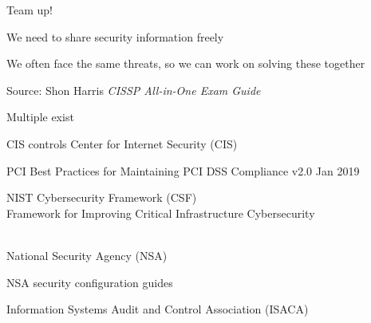 \documentclass[Screen16to9,17pt]{foils}
\begin{document}


\begin{list1}
\item Team up!
\item We need to share security information freely
\item We often face the same threats, so we can work on solving these together
\end{list1}





Source: Shon Harris \emph{CISSP All-in-One Exam Guide}




\begin{list1}
\item Multiple exist
\vskip 1cm
\begin{list2}
\item CIS controls Center for Internet Security (CIS) 
\item PCI Best Practices for Maintaining PCI DSS Compliance v2.0 Jan 2019
\item NIST Cybersecurity Framework (CSF)\\
Framework for Improving
Critical Infrastructure Cybersecurity\\ \\
\item National Security Agency (NSA)\\ 
\item NSA security configuration guides\\ 
\item Information Systems Audit and Control Association (ISACA)\\
\end{list2}
\end{list1}

\end{document}
